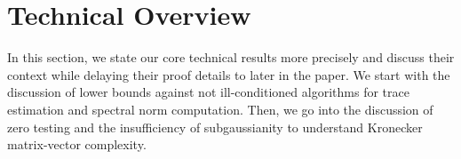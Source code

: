 

\section{Technical Overview}
\label{sec:overview}

In this section, we state our core technical results more precisely and discuss their context while delaying their proof details to later in the paper.
We start with the discussion of lower bounds against not ill-conditioned algorithms for trace estimation and spectral norm computation.
Then, we go into the discussion of zero testing and the insufficiency of subgaussianity to understand Kronecker matrix-vector complexity.





